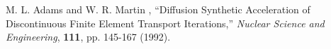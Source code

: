\documentclass[11pt]{article}
\begin{document}
\begin{thebibliography}{20}

 M. L. Adams and W. R. Martin , ``Diffusion Synthetic Acceleration of Discontinuous Finite Element Transport Iterations,'' {\it Nuclear Science and Engineering}, {\bf 111}, pp. 145-167 (1992).

\end{thebibliography}
\end{document}
